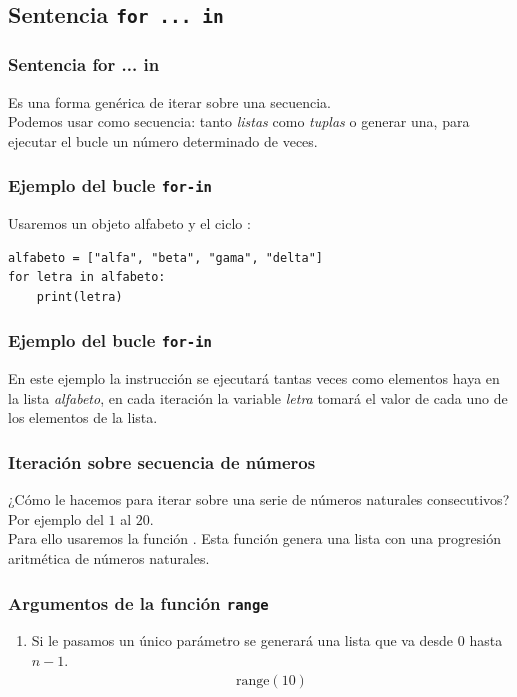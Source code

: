 \documentclass[12pt]{beamer}
\begin{document}
\subsection*{Sentencia \texttt{for ... in}}

\begin{frame}
\frametitle{Sentencia for ... in}
Es una forma genérica de iterar sobre una secuencia.
\\
\bigskip
\pause
Podemos usar como secuencia: \pause tanto \emph{listas} como \emph{tuplas} o generar una, para ejecutar el bucle un número determinado de veces.
\end{frame}
\begin{frame}[fragile]
\frametitle{Ejemplo del bucle \texttt{for-in}}
Usaremos un objeto alfabeto y el ciclo :
\pause
\begin{lstlisting}[caption=Ejemplo del ciclo for-in]
alfabeto = ["alfa", "beta", "gama", "delta"]
for letra in alfabeto:
    print(letra)
\end{lstlisting}
\end{frame}
\begin{frame}[fragile]
\frametitle{Ejemplo del bucle \texttt{for-in}}
En este ejemplo la instrucción  se ejecutará tantas veces como elementos haya en la lista \emph{alfabeto}, en cada iteración la variable \emph{letra} tomará el valor de cada uno de los elementos de la lista.
\end{frame}
\begin{frame}
\frametitle{Iteración sobre secuencia de números}
¿Cómo le hacemos para iterar sobre una serie de números naturales consecutivos? \pause Por ejemplo del $1$ al $20$.
\\
\bigskip
\pause
 Para ello usaremos la función . Esta función genera una lista con una progresión aritmética de números naturales.
 \end{frame}
\begin{frame}
\frametitle{Argumentos de la función \texttt{range}}
\begin{enumerate}[<+->]
\item Si le pasamos un único parámetro se generará una lista que va desde $0$ hasta $n-1$.
\pause
\begin{align*}
\mbox{range}(10)
\end{align*}
\seti
\end{enumerate}  
\end{frame}
\end{document}
